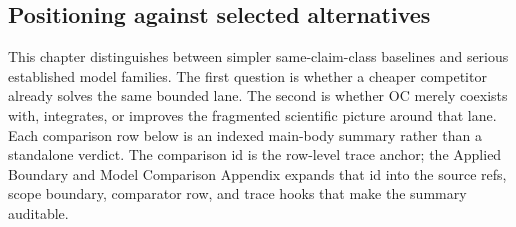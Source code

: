 \subsection{Positioning against selected alternatives}
This chapter distinguishes between simpler same-claim-class baselines and serious established model families. The first question is whether a cheaper competitor already solves the same bounded lane. The second is whether OC merely coexists with, integrates, or improves the fragmented scientific picture around that lane.
Each comparison row below is an indexed main-body summary rather than a standalone verdict. The comparison id is the row-level trace anchor; the Applied Boundary and Model Comparison Appendix expands that id into the source refs, scope boundary, comparator row, and trace hooks that make the summary auditable.

